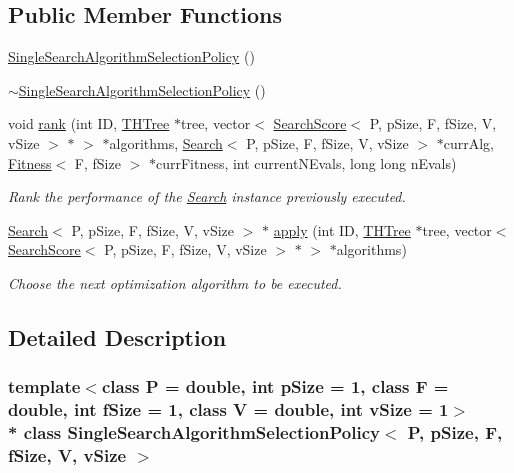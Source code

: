 \subsection*{Public Member Functions}
\begin{DoxyCompactItemize}
\item 
\hyperlink{classSingleSearchAlgorithmSelectionPolicy_a6c2a40a289df84789d12b8b753952654}{Single\+Search\+Algorithm\+Selection\+Policy} ()
\item 
\hyperlink{classSingleSearchAlgorithmSelectionPolicy_aafb2fbe25987c553cd58b1dc2473529c}{$\sim$\+Single\+Search\+Algorithm\+Selection\+Policy} ()
\item 
void \hyperlink{classSingleSearchAlgorithmSelectionPolicy_a68d2a8caed510f1a058ae29b323b35ae}{rank} (int ID, \hyperlink{classTHTree}{T\+H\+Tree} $\ast$tree, vector$<$ \hyperlink{classSearchScore}{Search\+Score}$<$ P, p\+Size, F, f\+Size, V, v\+Size $>$ $\ast$ $>$ $\ast$algorithms, \hyperlink{classSearch}{Search}$<$ P, p\+Size, F, f\+Size, V, v\+Size $>$ $\ast$curr\+Alg, \hyperlink{structFitness}{Fitness}$<$ F, f\+Size $>$ $\ast$curr\+Fitness, int current\+N\+Evals, long long n\+Evals)
\begin{DoxyCompactList}\small\item\em Rank the performance of the \hyperlink{classSearch}{Search} instance previously executed. \end{DoxyCompactList}\item 
\hyperlink{classSearch}{Search}$<$ P, p\+Size, F, f\+Size, V, v\+Size $>$ $\ast$ \hyperlink{classSingleSearchAlgorithmSelectionPolicy_a19c5ce181953ac7c88ba157da0a346ad}{apply} (int ID, \hyperlink{classTHTree}{T\+H\+Tree} $\ast$tree, vector$<$ \hyperlink{classSearchScore}{Search\+Score}$<$ P, p\+Size, F, f\+Size, V, v\+Size $>$ $\ast$ $>$ $\ast$algorithms)
\begin{DoxyCompactList}\small\item\em Choose the next optimization algorithm to be executed. \end{DoxyCompactList}\end{DoxyCompactItemize}


\subsection{Detailed Description}
\subsubsection*{template$<$class P = double, int p\+Size = 1, class F = double, int f\+Size = 1, class V = double, int v\+Size = 1$>$\\*
class Single\+Search\+Algorithm\+Selection\+Policy$<$ P, p\+Size, F, f\+Size, V, v\+Size $>$}

